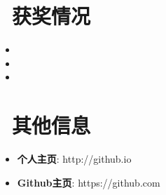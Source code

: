 \documentclass{resume}
\begin{document}
\section{\faHeartO\ 获奖情况}
\begin{itemize}
\item {}
\item {}
\item {}
\end{itemize}

\section{\faPaperPlane\ 其他信息}
\begin{itemize}
\item \textbf{个人主页}: http://github.io
\item \textbf{Github主页}: https://github.com
\end{itemize}
\end{document}
